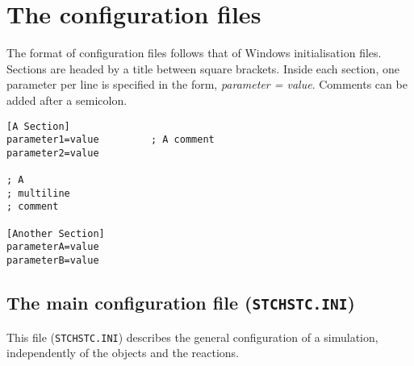 \chapter{The configuration files}\label{conf_files}

The format of \stochsim{} configuration files follows that of Windows
initialisation files. Sections are headed by a title between square
brackets.  Inside each section, one parameter per line is specified in
the form, \emph{parameter = value}.  Comments can be added after a
semicolon.

\begin{verbatim}
[A Section]
parameter1=value         ; A comment
parameter2=value

; A 
; multiline
; comment

[Another Section]
parameterA=value
parameterB=value
\end{verbatim}

\section{The main configuration file (\texttt{STCHSTC.INI})}
This file (\texttt{STCHSTC.INI}) describes the general configuration of a
simulation, independently of the objects and the reactions.


